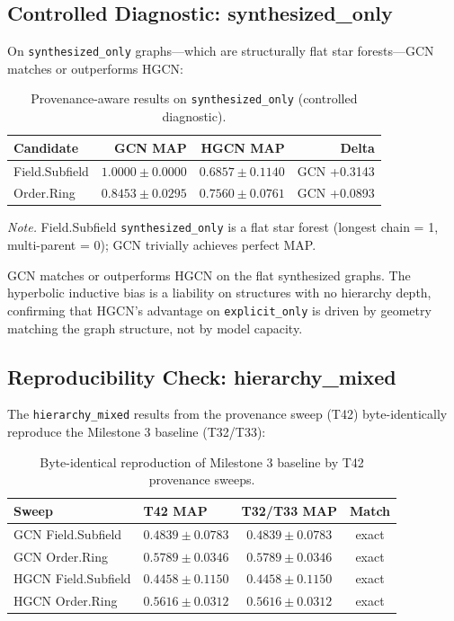 \documentclass[runningheads]{llncs}
\begin{document}
\subsection{Controlled Diagnostic: synthesized\_only}

On \texttt{synthesized\_only} graphs---which are structurally flat star forests---GCN matches or outperforms HGCN:

\begin{table}[h]
\centering
\caption{Provenance-aware results on \texttt{synthesized\_only} (controlled diagnostic).}
\label{tab:synthesized}
\begin{tabular}{lrrr}
\toprule
Candidate & GCN MAP & HGCN MAP & Delta \\
\midrule
Field.Subfield & $1.0000 \pm 0.0000$ & $0.6857 \pm 0.1140$ & GCN +0.3143 \\
Order.Ring     & $0.8453 \pm 0.0295$ & $0.7560 \pm 0.0761$ & GCN +0.0893 \\
\bottomrule
\end{tabular}
\end{table}

\noindent\textit{Note.} Field.Subfield \texttt{synthesized\_only} is a flat star forest (longest chain = 1, multi-parent = 0); GCN trivially achieves perfect MAP.

\smallskip

GCN matches or outperforms HGCN on the flat synthesized graphs. The hyperbolic inductive bias is a liability on structures with no hierarchy depth, confirming that HGCN's advantage on \texttt{explicit\_only} is driven by geometry matching the graph structure, not by model capacity.

\subsection{Reproducibility Check: hierarchy\_mixed}

The \texttt{hierarchy\_mixed} results from the provenance sweep (T42) byte-identically reproduce the Milestone 3 baseline (T32/T33):

\begin{table}[h]
\centering
\caption{Byte-identical reproduction of Milestone 3 baseline by T42 provenance sweeps.}
\label{tab:repro}
\begin{tabular}{llcc}
\toprule
Sweep & T42 MAP & T32/T33 MAP & Match \\
\midrule
GCN Field.Subfield   & $0.4839 \pm 0.0783$ & $0.4839 \pm 0.0783$ & exact \\
GCN Order.Ring       & $0.5789 \pm 0.0346$ & $0.5789 \pm 0.0346$ & exact \\
HGCN Field.Subfield  & $0.4458 \pm 0.1150$ & $0.4458 \pm 0.1150$ & exact \\
HGCN Order.Ring      & $0.5616 \pm 0.0312$ & $0.5616 \pm 0.0312$ & exact \\
\bottomrule
\end{tabular}
\end{table}
\end{document}
